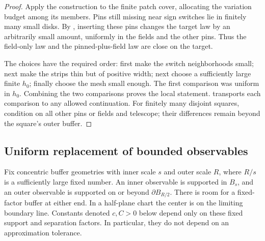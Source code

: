 \begin{proof}
Apply the construction to the finite patch cover, allocating the
variation budget among its members.  Pins still missing near sign
switches lie in finitely many small disks.  By , inserting
these pins changes the target law by an arbitrarily small amount,
uniformly in the fields and the other pins.  Thus the field-only law
and the pinned-plus-field law are close on the target.

The choices have the required order: first make the switch
neighborhoods small; next make the strips thin but of positive
width; next choose a sufficiently large finite $h_0$; finally choose
the mesh small enough.  The first comparison was uniform in $h_0$.
Combining the two comparisons proves the local statement.
 transports each comparison to any allowed
continuation.  For finitely many disjoint squares, condition on all
other pins or fields and telescope; their differences remain beyond
the square's outer buffer.
\end{proof}

\subsection{Uniform replacement of bounded observables}

Fix concentric buffer geometries with inner scale $s$ and outer scale
$R$, where $R/s$ is a sufficiently large fixed number.  An inner
observable is supported in $B_s$, and an outer observable is supported
on or beyond $\partial B_{R/2}$.  There is room for a fixed-factor
buffer at either end.  In a half-plane chart the center is on the
limiting boundary line.  Constants denoted $c,C>0$ below depend only
on these fixed support and separation factors.  In particular, they
do not depend on an approximation tolerance.

